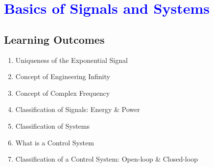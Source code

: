 \documentclass[../notes-main.tex]{subfiles}
\begin{document}
\chapter{\textcolor{blue}{Basics of Signals and Systems}}
\section*{Learning Outcomes}
\begin{enumerate}[label=\blacktriangleright, leftmargin=*, itemsep=0.5em]
    \item Uniqueness of the Exponential Signal
    \item Concept of Engineering Infinity
    \item Concept of Complex Frequency
    \item Classification of Signals: Energy \& Power
    \item Classification of Systems
    \item What is a Control System
    \item Classification of a Control System: Open-loop \& Closed-loop
\end{enumerate}
\newpage


\newpage

\newpage

\newpage

\end{document}

